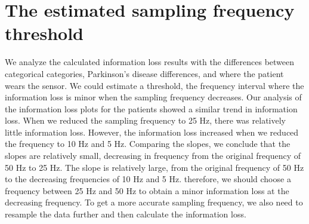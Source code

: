 \section{The estimated sampling frequency threshold}
We analyze the calculated information loss results with the differences between categorical categories, Parkinson's disease differences, and where the patient wears the sensor. We could estimate a threshold, the frequency interval where the information loss is minor when the sampling frequency decreases. Our analysis of the information loss plots for the patients showed a similar trend in information loss. When we reduced the sampling frequency to 25 Hz, there was relatively little information loss. However, the information loss increased when we reduced the frequency to 10 Hz and 5 Hz. Comparing the slopes, we conclude that the slopes are relatively small, decreasing in frequency from the original frequency of 50 Hz to 25 Hz. The slope is relatively large, from the original frequency of 50 Hz to the decreasing frequencies of 10 Hz and 5 Hz. therefore, we should choose a frequency between 25 Hz and 50 Hz to obtain a minor information loss at the decreasing frequency. To get a more accurate sampling frequency, we also need to resample the data further and then calculate the information loss. \\
\\ \hspace*{\fill} \\
